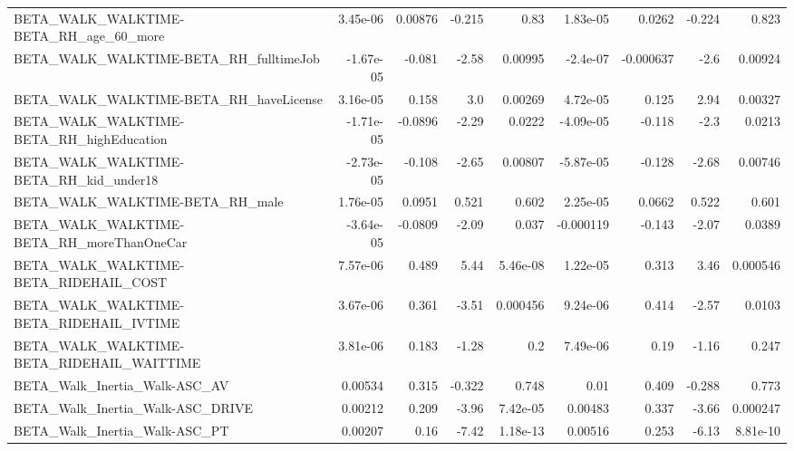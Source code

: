 \begin{tabular}{lrrrrrrrr}
BETA\_WALK\_WALKTIME-BETA\_RH\_age\_60\_more             &    3.45e-06 &      0.00876 &   -0.215 &     0.83 &   1.83e-05 &      0.0262 &       -0.224 &         0.823 \\
BETA\_WALK\_WALKTIME-BETA\_RH\_fulltimeJob             &   -1.67e-05 &       -0.081 &    -2.58 &  0.00995 &   -2.4e-07 &   -0.000637 &         -2.6 &       0.00924 \\
BETA\_WALK\_WALKTIME-BETA\_RH\_haveLicense             &    3.16e-05 &        0.158 &      3.0 &  0.00269 &   4.72e-05 &       0.125 &         2.94 &       0.00327 \\
BETA\_WALK\_WALKTIME-BETA\_RH\_highEducation           &   -1.71e-05 &      -0.0896 &    -2.29 &   0.0222 &  -4.09e-05 &      -0.118 &         -2.3 &        0.0213 \\
BETA\_WALK\_WALKTIME-BETA\_RH\_kid\_under18             &   -2.73e-05 &       -0.108 &    -2.65 &  0.00807 &  -5.87e-05 &      -0.128 &        -2.68 &       0.00746 \\
BETA\_WALK\_WALKTIME-BETA\_RH\_male                    &    1.76e-05 &       0.0951 &    0.521 &    0.602 &   2.25e-05 &      0.0662 &        0.522 &         0.601 \\
BETA\_WALK\_WALKTIME-BETA\_RH\_moreThanOneCar          &   -3.64e-05 &      -0.0809 &    -2.09 &    0.037 &  -0.000119 &      -0.143 &        -2.07 &        0.0389 \\
BETA\_WALK\_WALKTIME-BETA\_RIDEHAIL\_COST              &    7.57e-06 &        0.489 &     5.44 & 5.46e-08 &   1.22e-05 &       0.313 &         3.46 &      0.000546 \\
BETA\_WALK\_WALKTIME-BETA\_RIDEHAIL\_IVTIME            &    3.67e-06 &        0.361 &    -3.51 & 0.000456 &   9.24e-06 &       0.414 &        -2.57 &        0.0103 \\
BETA\_WALK\_WALKTIME-BETA\_RIDEHAIL\_WAITTIME          &    3.81e-06 &        0.183 &    -1.28 &      0.2 &   7.49e-06 &        0.19 &        -1.16 &         0.247 \\
BETA\_Walk\_Inertia\_Walk-ASC\_AV                      &     0.00534 &        0.315 &   -0.322 &    0.748 &       0.01 &       0.409 &       -0.288 &         0.773 \\
BETA\_Walk\_Inertia\_Walk-ASC\_DRIVE                   &     0.00212 &        0.209 &    -3.96 & 7.42e-05 &    0.00483 &       0.337 &        -3.66 &      0.000247 \\
BETA\_Walk\_Inertia\_Walk-ASC\_PT                      &     0.00207 &         0.16 &    -7.42 & 1.18e-13 &    0.00516 &       0.253 &        -6.13 &      8.81e-10 \\

\end{tabular}
